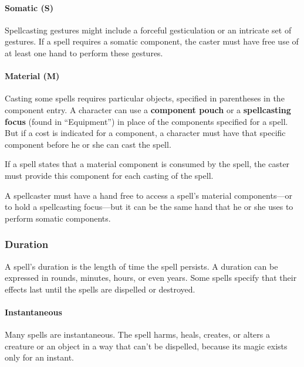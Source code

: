 \documentclass[
]{article}
\begin{document}
\hypertarget{somatic-s}{%
\paragraph{Somatic (S)}\label{somatic-s}}

Spellcasting gestures might include a forceful gesticulation or an
intricate set of gestures. If a spell requires a somatic component, the
caster must have free use of at least one hand to perform these
gestures.

\hypertarget{material-m}{%
\paragraph{Material (M)}\label{material-m}}

Casting some spells requires particular objects, specified in
parentheses in the component entry. A character can use a
\textbf{component pouch} or a \textbf{spellcasting focus} (found in
``Equipment'') in place of the components specified for a spell. But if
a cost is indicated for a component, a character must have that specific
component before he or she can cast the spell.

If a spell states that a material component is consumed by the spell,
the caster must provide this component for each casting of the spell.

A spellcaster must have a hand free to access a spell's material
components---or to hold a spellcasting focus---but it can be the same
hand that he or she uses to perform somatic components.

\hypertarget{duration}{%
\subsubsection{Duration}\label{duration}}

A spell's duration is the length of time the spell persists. A duration
can be expressed in rounds, minutes, hours, or even years. Some spells
specify that their effects last until the spells are dispelled or
destroyed.

\hypertarget{instantaneous}{%
\paragraph{Instantaneous}\label{instantaneous}}

Many spells are instantaneous. The spell harms, heals, creates, or
alters a creature or an object in a way that can't be dispelled, because
its magic exists only for an instant.
\end{document}

